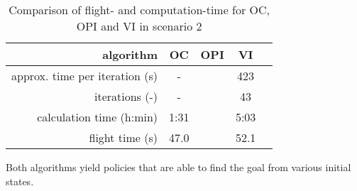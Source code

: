 \begin{table}[h]
	\begin{center}
		\begin{tabular}{r|c c c c}
			algorithm & OC & OPI & VI \\ \hline 
			approx. time per iteration (s) & - & & 423 \\
			iterations (-) & - &  & 43 \\
			calculation time (h:min) & 1:31 & & 5:03 \\
			flight time (s) & 47.0  & & 52.1
		\end{tabular}
		\caption{Comparison of flight- and computation-time for OC, OPI and VI in scenario 2}
		\label{tab:2d_flight_data_1000m}
	\end{center}
\end{table}

Both algorithms yield policies that are able to find the goal from various initial states. 


